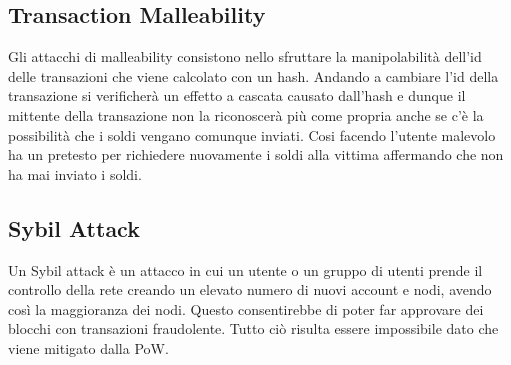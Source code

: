 \subsection{Transaction Malleability }

Gli attacchi di malleability consistono nello sfruttare la manipolabilità
dell'id delle transazioni che viene calcolato con un hash. Andando a cambiare
l'id della transazione si verificherà un effetto a cascata causato dall'hash e
dunque il mittente della transazione non la riconoscerà più come propria anche
se c'è la possibilità che i soldi vengano comunque inviati. Cosi facendo
l'utente malevolo ha un pretesto per richiedere nuovamente i soldi alla vittima
affermando che non ha mai inviato i soldi.

\subsection{Sybil Attack}

Un Sybil attack è un attacco in cui un utente o un gruppo di utenti prende il
controllo della rete creando un elevato numero di nuovi account e nodi, avendo
così la maggioranza dei nodi. Questo consentirebbe di poter far approvare dei
blocchi con transazioni fraudolente. Tutto ciò risulta essere impossibile dato
che viene mitigato dalla PoW.
